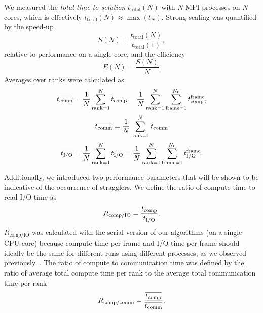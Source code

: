 We measured the \emph{total time to solution} $t_{\text{total}}(N)$ with $N$ MPI processes on $N$ cores, which is effectively
$t_{\text{total}}(N) \approx \max(t_{N})$. 
Strong scaling was quantified by the speed-up
\begin{equation}
  \label{eq:speedup}
  S(N) = \frac{t_{\text{total}}(N)}{t_{\text{total}}(1)},
\end{equation}
relative to performance on a single core, and the efficiency
\begin{equation}
  \label{eq:efficiency}
  E(N) = \frac{S(N)}{N}.
\end{equation}
Averages over ranks were calculated as
\begin{equation}
\overline{{t}_{\text{comp}}} = \frac{1}{N}
\sum_{\text{rank}=1}^{N}{t}_{\text{comp}} = \frac{1}{N}\sum_{\text{rank}=1}^{N}\sum_{\text{frame}=1}^{N_\text{b}}{t}_{\text{comp}}^{\text{frame}},
\end{equation}
\begin{equation}
\overline{t_{\text{comm}}} = \frac{1}{N}\sum_{\text{rank}=1}^{N}t_{\text{comm}}
\end{equation}
\begin{equation}
\overline{{t}_{\text{I/O}}} = \frac{1}{N}\sum_{\text{rank}=1}^{N}{t}_{\text{I/O}} = \frac{1}{N}\sum_{\text{rank}=1}^{N}\sum_{\text{frame}=1}^{N_{\text{b}}}{t}_{\text{I/O}}^{\text{frame}}.
\end{equation}

Additionally, we introduced two performance parameters that will be shown to be indicative of the occurrence of stragglers.
We define the ratio of compute time to read I/O time as
\begin{equation}
  R_{\text{comp/IO}} = \frac{{t}_{\text{comp}}}{{t}_{\text{I/O}}}.
  \label{eq:Compute-IO}
\end{equation}
$R_{\text{comp/IO}}$ was calculated with the serial version of our algorithms (on a single CPU core) because compute time per frame and I/O time per frame should ideally be the same for different runs using different processes, as we observed previously~\cite{Khoshlessan:2017ab}.
The ratio of compute to communication time was defined by the ratio of average total compute time per rank to the average total communication time per rank  
\begin{equation}
  \label{eq:Compute-comm}
  R_{\text{comp/comm}} = \frac{\overline{{t}_{\text{comp}}}}{\overline{t_{\text{comm}}}}.
\end{equation}
 
